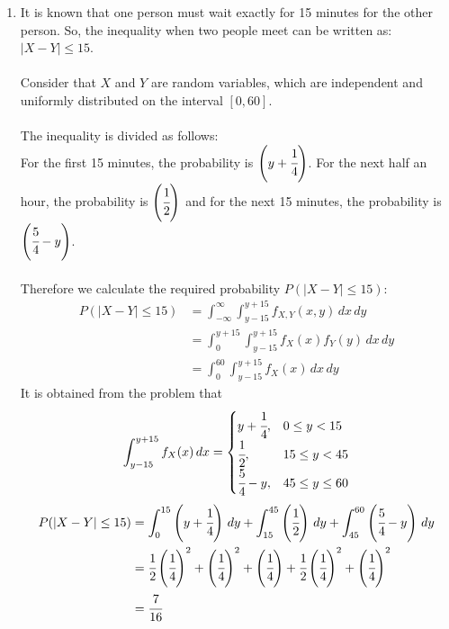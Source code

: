 \documentclass{article}
\begin{document}
\begin{enumerate}
\begin{enumerate}
    \item 
        It is known that one person must wait exactly for 15 minutes for the other person. So, the inequality when two people meet can be written as: \(|X - Y| \leq 15\).\\\\
        Consider that \(X\) and \(Y\) are random variables, which are independent and uniformly distributed on the interval \([0,60]\).\\\\
        The inequality is divided as follows:\\
        For the first 15 minutes, the probability is \(\left(y + \cfrac{1}{4}\right)\). For the next half an hour, the probability is \(\left(\cfrac{1}{2}\right)\) and for the next 15 minutes, the probability is \(\left(\cfrac{5}{4} - y\right)\).\\\\
        Therefore we calculate the required probability \(P(|X - Y| \leq 15)\):
        \begin{align*}
            P(|X - Y| \leq 15) &= \int_{-\infty}^{\infty} \int_{y-15}^{y+15} f_{X,Y}(x,y) \,dx\,dy\\
            &= \int_0^{y+15} \int_{y-15}^{y+15} f_{X}(x) f_{Y}(y) \,dx\,dy\\
            &= \int_0^{60}\int_{y-15}^{y+15} f_{X}(x) \,dx\,dy
        \end{align*}
        It is obtained from the problem that
        \[
            \int_{y-15}^{y+15} f_{X}(x) \,dx = 
            \begin{cases} 
            y + \cfrac{1}{4}, & 0 \leq y < 15 \\
            \cfrac{1}{2}, & 15 \leq y < 45 \\
            \cfrac{5}{4} - y, & 45 \leq y \leq 60 
            \end{cases}
        \]
        \begin{align*}
            P(|X - Y| \leq 15) &= \int_{0}^{15} \left(y + \cfrac{1}{4}\right) \,dy + \int_{15}^{45} \left(\cfrac{1}{2}\right) \,dy + \int_{45}^{60} \left(\cfrac{5}{4} - y\right) \,dy\\
            &= \cfrac{1}{2} \left(\cfrac{1}{4}\right)^2 + \left(\cfrac{1}{4}\right)^2 + \left(\cfrac{1}{4}\right) + \cfrac{1}{2} \left(\cfrac{1}{4}\right)^2 + \left(\cfrac{1}{4}\right)^2\\
            &= \cfrac{7}{16}
        \end{align*}
    \end{enumerate}
\end{enumerate}
\end{document}

